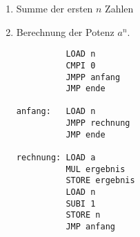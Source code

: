 \documentclass{lehramt-informatik-haupt}
\begin{document}
\begin{enumerate}
\begin{enumerate}
\begin{multicols}{2}
\liSpaltenUmbruch
{}

\begin{verbatim}
PROGRAM groesser;
VAR x, y, ergebnis;
BEGIN
  IF x > y THEN
    ergebnis := 1;
  ELSE
    ergebnis := 0;
  END
END groesser.
\end{verbatim}
\vfill\strut
\end{multicols}

%

\item Bestimmung, ob eine Zahl gerade ist oder nicht.

\begin{multicols}{2}

\begin{verbatim}
          LOAD x
          MODI 2
          STORE hi$1
          LOAD hi$1
          CMPI 0
          JMPNZ M$1
          LOADI 1
          STORE ergebnis
          JMP M$2
M$1:      LOADI 0
          STORE ergebnis
M$2:      HOLD
x:        WORD 0
ergebnis: WORD 0
hi$1:     WORD 0
\end{verbatim}

\liSpaltenUmbruch
{}

\begin{verbatim}
PROGRAM gerade;
VAR x, ergebnis;
BEGIN
  IF x % 2 = 0 THEN
    ergebnis := 1;
  ELSE
    ergebnis := 0;
  END
END gerade.
\end{verbatim}
\vfill\strut
\end{multicols}

\end{enumerate}

%

\item Summe der ersten $n$ Zahlen

%

\item Berechnung der Potenz $a^n$.

\begin{multicols}{2}

\begin{verbatim}
          LOAD n
          CMPI 0
          JMPP anfang
          JMP ende

anfang:   LOAD n
          JMPP rechnung
          JMP ende

rechnung: LOAD a
          MUL ergebnis
          STORE ergebnis
          LOAD n
          SUBI 1
          STORE n
          JMP anfang


\end{verbatim}
\end{multicols}
\end{enumerate}
\end{document}
